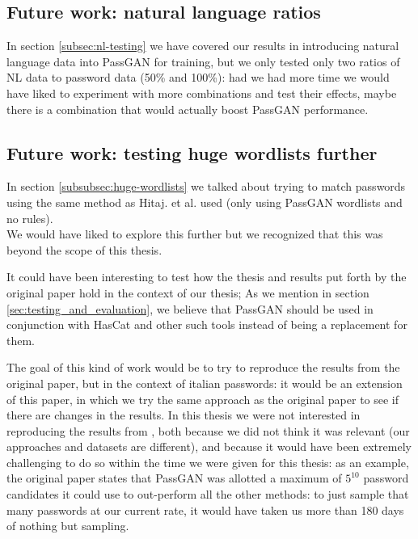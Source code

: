 \subsection{Future work: natural language ratios}
In section \ref{subsec:nl-testing} we have covered our results in introducing natural language data into PassGAN for training, but we only tested only two ratios of NL data to password data (50\% and 100\%): had we had more time we would have liked to experiment with more combinations and test their effects, maybe there is a combination that would actually boost PassGAN performance.

\subsection{Future work: testing huge wordlists further}
In section \ref{subsubsec:huge-wordlists} we talked about trying to match passwords using the same method as Hitaj. et al. used (only using PassGAN wordlists and no rules).\\
We would have liked to explore this further but we recognized that this was beyond the scope of this thesis. 

It could have been interesting to test how the thesis and results put forth by the original paper hold in the context of our thesis; As we mention in section \ref{sec:testing_and_evaluation}, we believe that PassGAN should be used in conjunction with HasCat and other such tools instead of being a replacement for them.

The goal of this kind of work would be to try to reproduce the results from the original paper, but in the context of italian passwords: it would be an extension of this paper, in which we try the same approach as the original paper to see if there are changes in the results.
In this thesis we were not interested in reproducing the results from \cite{PassGAN}, both because we did not think it was relevant (our approaches and datasets are different), and because it would have been extremely challenging to do so within the time we were given for this thesis: as an example, the original paper states that PassGAN was allotted a maximum of $5^{10}$ password candidates it could use to out-perform all the other methods: to just sample that many passwords at our current rate, it would have taken us more than 180 days of nothing but sampling.

